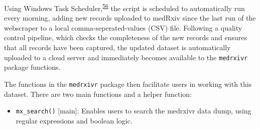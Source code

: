 \documentclass[a4paper, twoside]{templates/ociamthesis}
\providecommand{\tightlist}{%
  \setlength{\itemsep}{0pt}\setlength{\parskip}{0pt}}
\newenvironment{Shaded}{\begin{snugshade}}{\end{snugshade}}
\newcommand{\CommentTok}[1]{\textcolor[rgb]{0.56,0.35,0.01}{\textit{#1}}}
\newcommand{\KeywordTok}[1]{\textcolor[rgb]{0.13,0.29,0.53}{\textbf{#1}}}
\newcommand{\NormalTok}[1]{#1}
\newcommand{\OperatorTok}[1]{\textcolor[rgb]{0.81,0.36,0.00}{\textbf{#1}}}
\newcommand{\StringTok}[1]{\textcolor[rgb]{0.31,0.60,0.02}{#1}}
\renewenvironment{Shaded}
{
  \vspace{4pt}%
  \begin{snugshade}%
}{%
  \end{snugshade}%
  \vspace{4pt}%
}
\begin{document}
\begin{Shaded}
\end{Shaded}

Using Windows Task Scheduler,\textsuperscript{\protect\hyperlink{ref-zotero-880}{56}} the script is scheduled to automatically run every morning, adding new records uploaded to medRxiv since the last run of the webscraper to a local comma-seperated-values (CSV) file. Following a quality control pipeline, which checks the completeness of the new records and ensures that all records have been captured, the updated dataset is automatically uploaded to a cloud server and immediately becomes available to the \texttt{medrxivr} package functions.

The functions in the \texttt{medrxivr} package then facilitate users in working with this dataset. There are two main functions and a helper function:

\begin{itemize}
\tightlist
\item
  \texttt{mx\_search()} {[}main{]}: Enables users to search the medrxivr data dump, using regular expressions and boolean logic.
\end{itemize}
\end{document}
